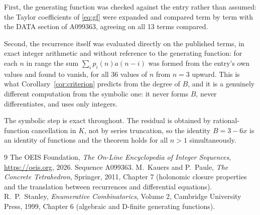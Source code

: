 \documentclass[11pt,a4paper]{article}
\theoremstyle{plain}
\theoremstyle{definition}
\begin{document}
First, the generating function was checked against the entry rather than assumed: the
Taylor coefficients of \eqref{eq:gf} were expanded and compared term by term with the DATA
section of A099363, agreeing on all 13 terms compared.

Second, the recurrence itself was evaluated directly on the published terms, in exact
integer arithmetic and without reference to the generating function: for each $n$ in range
the sum $\sum_{i}p_{i}(n)a(n-i)$ was formed from the entry's own values and found to
vanish, for all 36 values of $n$ from $n=3$ upward. This is what
Corollary~\ref{cor:criterion} predicts from the degree of $B$, and it is a genuinely
different computation from the symbolic one: it never forms $B$, never differentiates, and
uses only integers.

The symbolic step is exact throughout. The residual is obtained by rational-function
cancellation in $K$, not by series truncation, so the identity $B=3 - 6 x$ is an
identity of functions and the theorem holds for all $n>1$ simultaneously.

\begin{thebibliography}{9}
 The OEIS Foundation, \emph{The On-Line Encyclopedia of Integer Sequences},
\url{https://oeis.org}, 2026. Sequence A099363.
 M.~Kauers and P.~Paule, \emph{The Concrete Tetrahedron}, Springer, 2011,
Chapter 7 (holonomic closure properties and the translation between recurrences and
differential equations).
 R.~P.~Stanley, \emph{Enumerative Combinatorics}, Volume 2, Cambridge
University Press, 1999, Chapter 6 (algebraic and D-finite generating functions).
\end{thebibliography}
\end{document}
